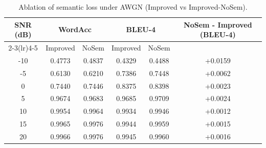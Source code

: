 \begin{table}[htbp]
\centering
\caption{Ablation of semantic loss under AWGN (Improved vs Improved-NoSem).}
\begin{tabular}{cccccc}
\toprule
SNR (dB) & \multicolumn{2}{c}{WordAcc} & \multicolumn{2}{c}{BLEU-4} & NoSem - Improved (BLEU-4) \\
\cmidrule(lr){2-3}\cmidrule(lr){4-5}
& Improved & NoSem & Improved & NoSem & \\
\midrule
-10 & 0.4773 & 0.4837 & 0.4329 & 0.4488 & +0.0159 \\
-5  & 0.6130 & 0.6210 & 0.7386 & 0.7448 & +0.0062 \\
0   & 0.7440 & 0.7446 & 0.8375 & 0.8398 & +0.0023 \\
5   & 0.9674 & 0.9683 & 0.9685 & 0.9709 & +0.0024 \\
10  & 0.9954 & 0.9964 & 0.9934 & 0.9946 & +0.0012 \\
15  & 0.9965 & 0.9976 & 0.9944 & 0.9959 & +0.0015 \\
20  & 0.9966 & 0.9976 & 0.9945 & 0.9960 & +0.0016 \\
\bottomrule
\end{tabular}
\label{tab:ablation}
\end{table}

